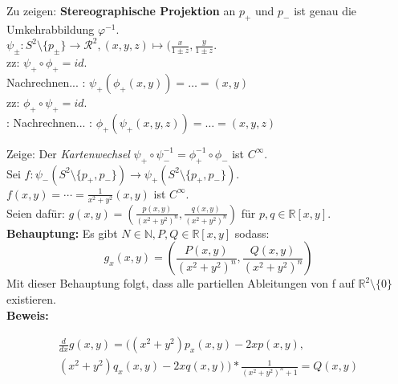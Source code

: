 \begin{problem*}[1a]
Zu zeigen: \textbf{Stereographische Projektion} an $ p_+ $ und $ p_- $ ist genau die Umkehrabbildung $ \varphi^{ -1 }$. \\
$\psi_\pm : S^2 \setminus  \{ p_\pm \} \to \mathcal{R^2}, (x,y,z) \mapsto (\frac{x}{1\pm z},\frac{y}{1\pm z}$.\\
zz: $ \psi_+ \circ \phi_+ = id $.\\ Nachrechnen... : $\psi_+ ( \phi_+ (x,y)) = \dots = (x,y)$\\
zz: $\phi_+ \circ  \psi_+ = id$. \\: Nachrechnen... : $\phi_+ ( \psi_+ (x,y,z)) = \dots = (x,y,z)$\\
\end{problem*}

\begin{problem*}[1b]
Zeige: Der \emph{Kartenwechsel} $\psi_+ \circ \psi_-^{ -1 } = \phi_+^{ -1 } \circ \phi_-$ ist $ C^{ \infty  } $.\\
Sei $f: \psi_- (S^{ 2 } \setminus \{ p_+, p_- \}) \to \psi_+(S^{ 2 } \setminus \{ p_+, p_- \})$.\\
$f(x,y) = \cdots = \frac{1}{x^2 + y^2}(x,y)$ ist $C^{ \infty  } $.\\
Seien dafür: $g(x,y) = ( \frac{p(x,y)}{(x^2 + y^2)^n}, \frac{q(x,y)}{(x^2 + y^2)^n})$ für $p,q \in \mathbb{R}[x,y]$.\\
\textbf{Behauptung:} Es gibt $N \in \mathbb{N}, P, Q \in \mathbb{R}[x,y]$ sodass:
\begin{equation*}
  g_x(x,y) = \left( \frac{P(x,y)}{(x^2 + y^2)^n}, \frac{Q(x,y)}{(x^2 + y^2)^n}\right)
\end{equation*}
Mit dieser Behauptung folgt, dass alle partiellen Ableitungen von f auf $ \mathbb{R}^2 \setminus \{ 0 \} $ existieren.\\
\textbf{Beweis:}

\begin{align*}
  \frac{d}{dx} g(x,y) = ((x^2 + y^2) p_x(x,y) - 2x p(x,y), \\
   (x^2 + y^2) q_x(x,y) - 2x q(x,y))
   * \frac{1}{(x^2 + y^2)^n+1} = Q(x,y)
\end{align*}

\end{problem*}

